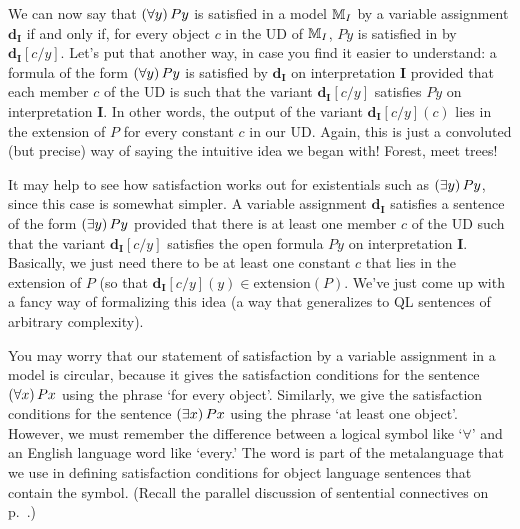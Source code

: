 
{\color{black}We can now say that $(\forall y) \, Py$ is satisfied in a model $\mathbb{M}_I$ by a variable assignment $\mathbf{d_I}$ if and only if, for every object $c$ in the UD of $\mathbb{M}_I$, $Py$ is satisfied in  by $\mathbf{d_I}[c/y]$. Let's put that another way, in case you find it easier to understand: a formula of the form $(\forall y) \, Py$ is satisfied by $\mathbf{d_I}$ on interpretation $\textbf{I}$ provided that each member $c$ of the UD is such that the variant $\mathbf{d_I}[c/y]$ satisfies $Py$ on interpretation $\textbf{I}$. In other words, the output of the variant $\mathbf{d_I}[c/y](c)$ lies in the extension of $P$ for every constant $c$ in our UD. Again, this is just a convoluted (but precise) way of saying the intuitive idea we began with! Forest, meet trees!} 

{\color{black}It may help to see how satisfaction works out for existentials such as $(\exists y) \, Py$, since this case is somewhat simpler. A variable assignment $\mathbf{d_I}$ satisfies a sentence of the form $(\exists y) \, Py$ provided that there is at least one member $c$ of the UD such that the variant $\mathbf{d_I}[c/y]$ satisfies the open formula $Py$ on interpretation $\textbf{I}$. Basically, we just need there to be at least one constant $c$ that lies in the extension of $P$ (so that $\mathbf{d_I}[c/y](y) \in \text{extension}(P)$. We've just come up with a fancy way of formalizing this idea (a way that generalizes to QL sentences of arbitrary complexity).} 


You may worry that our statement of satisfaction by a variable assignment in a model is circular, because it gives the satisfaction conditions for the sentence $(\forall x) \, Px$ using the phrase `for every object'. Similarly, we give the satisfaction conditions for the sentence $(\exists x) \, Px$ using the phrase `at least one object'. However, we must remember the difference between a logical symbol like `$\forall$' and an English language word like `every.' The word is part of the metalanguage that we use in defining satisfaction conditions for object language sentences that contain the symbol. (Recall the parallel discussion of sentential connectives on p.\ \pageref{truthdefinition}.)

